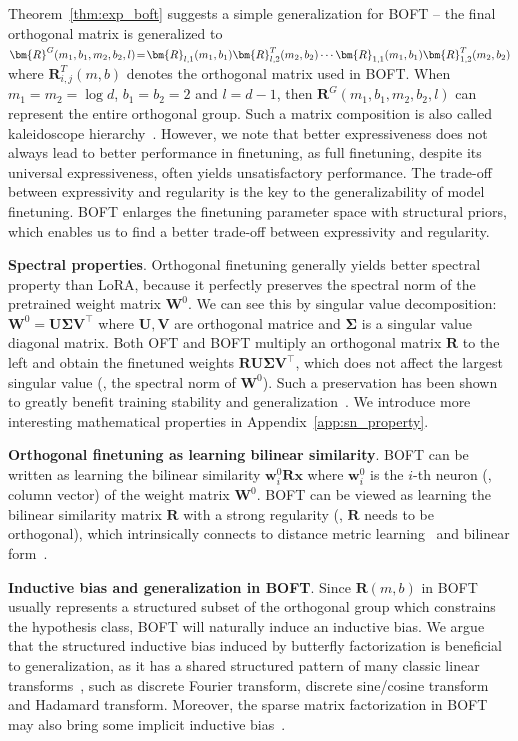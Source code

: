 Theorem~\ref{thm:exp_boft} suggests a simple generalization for BOFT -- the final orthogonal matrix is generalized to $\thickmuskip=2mu \medmuskip=2mu \bm{R}^G(m_1,b_1,m_2,b_2,l)=\bm{R}_{l,1}(m_1,b_1)\bm{R}_{l,2}^T(m_2,b_2)\cdots\bm{R}_{1,1}(m_1,b_1)\bm{R}_{1,2}^T(m_2,b_2)$ where $\bm{R}_{i,j}^T(m,b)$ denotes the orthogonal matrix used in BOFT. When $m_1=m_2=\log d$, $b_1=b_2=2$ and $l=d-1$, then $\bm{R}^G(m_1,b_1,m_2,b_2,l)$ can represent the entire orthogonal group. Such a matrix composition is also called kaleidoscope hierarchy~\cite{dao2019kaleidoscope}. However, we note that better expressiveness does not always lead to better performance in finetuning, as full finetuning, despite its universal expressiveness, often yields unsatisfactory performance. The trade-off between expressivity and regularity is the key to the generalizability of model finetuning. BOFT enlarges the finetuning parameter space with structural priors, which enables us to find a better trade-off between expressivity and regularity.

\textbf{Spectral properties}. Orthogonal finetuning generally yields better spectral property than LoRA, because it perfectly preserves the spectral norm of the pretrained weight matrix $\bm{W}^0$. We can see this by singular value decomposition: $\bm{W}^0=\bm{U}\bm{\Sigma}\bm{V}^\top$ where $\bm{U},\bm{V}$ are orthogonal matrice and $\bm{\Sigma}$ is a singular value diagonal matrix. Both OFT and BOFT multiply an orthogonal matrix $\bm{R}$ to the left and obtain the finetuned weights $\bm{R}\bm{U}\bm{\Sigma}\bm{V}^\top$, which does not affect the largest singular value (\ie, the spectral norm of $\bm{W}^0$). Such a preservation has been shown to greatly benefit training stability and generalization~\cite{miyato2018spectral,yoshida2017spectral}. We introduce more interesting mathematical properties in Appendix~\ref{app:sn_property}.

\textbf{Orthogonal finetuning as learning bilinear similarity}. BOFT can be written as learning the bilinear similarity $\bm{w}^0_i\bm{R}\bm{x}$ where $\bm{w}^0_i$ is the $i$-th neuron (\ie, column vector) of the weight matrix $\bm{W}^0$. BOFT can be viewed as learning the bilinear similarity matrix $\bm{R}$ with a strong regularity (\ie, $\bm{R}$ needs to be orthogonal), which intrinsically connects to distance metric learning~\cite{xing2002distance} and bilinear form~\cite{roman2005advanced}.

\textbf{Inductive bias and generalization in BOFT}. Since $\bm{R}(m,b)$ in BOFT usually represents a structured subset of the orthogonal group which constrains the hypothesis class, BOFT will naturally induce an inductive bias. We argue that the structured inductive bias induced by butterfly factorization is beneficial to generalization, as it has a shared structured pattern of many classic linear transforms~\cite{dao2019kaleidoscope}, such as discrete Fourier transform, discrete sine/cosine transform and Hadamard transform. Moreover, the sparse matrix factorization in BOFT may also bring some implicit inductive bias~\cite{gunasekar2017implicit,li2018algorithmic,liu2019neural}.


